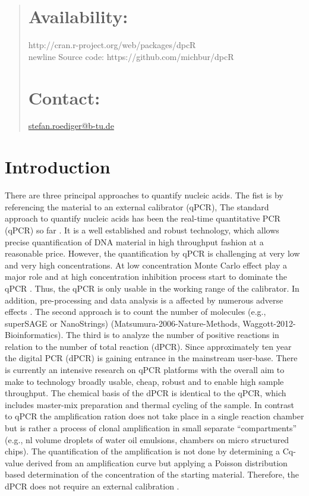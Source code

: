 \documentclass{bioinfo}
\begin{document}
\begin{abstract}
\section{Availability:}
http://cran.r-project.org/web/packages/dpcR\\newline
Source code: https://github.com/michbur/dpcR\

\section{Contact:} \href{stefan.roediger@b-tu.de}{stefan.roediger@b-tu.de}
\end{abstract}

\section{Introduction}
There are three principal approaches to quantify nucleic acids. The fist is by 
referencing the material to an external calibrator (qPCR), The standard approach 
to quantify nucleic acids has been the real-time quantitative PCR (qPCR) so far 
\cite{pabinger_survey_2014}. It is a well established and robust technology, 
which allows precise quantification of DNA material in high throughput fashion 
at a reasonable price. However, the quantification by qPCR is challenging at 
very low and very high concentrations. At low concentration Monte Carlo effect 
play a major role and at high concentration inhibition process start to dominate 
the qPCR . Thus, the qPCR is only usable in the working range of the calibrator. 
In addition, pre-processing and data analysis is a affected by numerous adverse 
effects \cite{spiess_impact_2015}. The second approach is to count the number of 
molecules (e.g., superSAGE or NanoStrings) (Matsumura-2006-Nature-Methods, 
Waggott-2012-Bioinformatics). The third is to analyze the number of positive 
reactions in relation to the number of total reaction (dPCR). Since 
approximately ten year the digital PCR (dPCR) is gaining entrance in the 
mainstream user-base. There is currently an intensive research on qPCR platforms 
with the overall aim to make to technology broadly usable, cheap, robust and to 
enable high sample throughput. The chemical basis of the dPCR is identical to 
the qPCR, which includes master-mix preparation and thermal cycling of the 
sample. In contrast to qPCR the amplification ration does not take place in a 
single reaction chamber but is rather a process of clonal amplification in small 
separate ``compartments'' (e.g., nl volume droplets of water oil emulsions, 
chambers on micro structured chips). The quantification of the amplification is 
not done by determining a Cq-value derived from an amplification curve but 
applying a Poisson distribution based determination of the concentration of the 
starting material. Therefore, the dPCR does not require an external calibration 
\cite{selck_increased_2013, rodiger_r_2015}.
\end{document}
